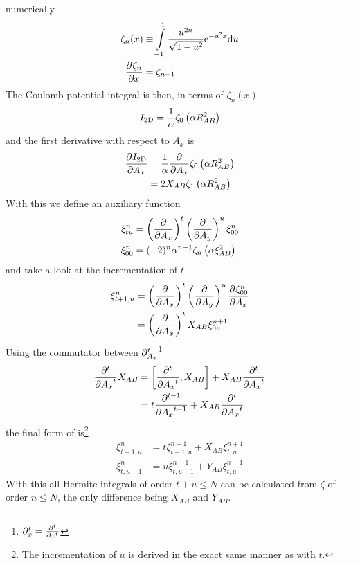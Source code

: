     numerically
        \begin{equation}
            \begin{aligned}
                \zeta_n(x) &\equiv \int\limits^1_{-1} \frac{u^{2n}}{\sqrt{1 -
                u^2}} \me^{-u^2x} \md u \\
                \prd{x}[\zeta_n] &= \zeta_{n+1}
            \end{aligned}
            \label{eq:zetaDef}
        \end{equation}
    The Coulomb potential integral is then, in terms of $\zeta_n(x)$
        \begin{equation}
            I_{\text{2D}} = \frac{1}{\alpha} \zeta_0\left(\alpha R^2_{AB}\right)
        \end{equation}
    and the first derivative with respect to $A_x$ is
        \begin{align}
            \prd{A_x}[\twoDI] &= \frac{1}{\alpha} \prd{A_x}
            \zeta_0\left(\alpha R^2_{AB}\right) \nonumber \\
            &= 2X_{AB}\zeta_1\left(\alpha R^2_{AB}\right)
        \end{align}
    With this we define an auxiliary function
        \begin{equation}
            \begin{aligned}
                \xi^n_{tu} &=\left(\frac{\mathrm{\partial}}{\mathrm{\partial} A_x}\right)^{t}\left(\frac{\mathrm{\partial}}{\mathrm{\partial} A_y}\right)^{u} \xi^n_{00} \\
                \xi^n_{00} &= (-2)^n\alpha^{n-1} \zeta_n\left(\alpha
                \xi^2_{AB}\right)
            \end{aligned}
        \end{equation}
    and take a look at the incrementation of $t$
        \begin{align}
            \xi^n_{t+1,u} &= \prdp{A_x}{t}\prdp{A_y}{u} \prd{A_x}[\xi^n_{00}]
            \nonumber \\
            &= \prdp{A_x}{t}X_{AB}\xi^{n+1}_{0u}
            \label{eq:Rtincr}
        \end{align}
    Using the commutator between
    $\mathrm{\partial}^t_{A_x}$\footnote{$\prtl^t_x=\prd{x}[][t]$}
        \begin{align}
            \prd{A_x}[][t] X_{AB} &= \left[\prd{A_x}[][t], X_{AB}\right] +
            X_{AB}\prd{A_x}[][t] \nonumber \\
            &= t\prd{A_x}[][t-1] + X_{AB}\prd{A_x}[][t]
        \end{align}
    the final form of  is\footnote{The incrementation of $u$ is
    derived in the exact same manner as with $t$.}
        \begin{equation}
            \begin{aligned}
                \xi^n_{t+1,u} &= t\xi^{n+1}_{t-1,u} + X_{AB}\xi^{n+1}_{t,u} \\
                \xi^n_{t,u+1} &= u\xi^{n+1}_{t,u-1} + Y_{AB}\xi^{n+1}_{t,u}
            \end{aligned}
        \end{equation}
    With this all Hermite integrals of order $t+u\leq N$ can be calculated from
    $\zeta$ of order $n\leq N$, the only difference being $X_{AB}$ and $Y_{AB}$.

